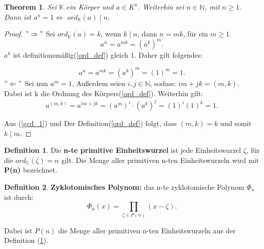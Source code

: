 \documentclass[12pt,oneside]{article}
\newtheorem{theorem}{Theorem}[section]
\theoremstyle{remark}
\theoremstyle{definition}
\newtheorem{definition}{Definition}[section]
\begin{document}
\smallskip

\begin{theorem}
Sei $\mathbb{K}$ ein Körper und $a \in K^x$. Weiterhin sei $ n \in \mathbb{N}$, mit $n \geq 1$. Dann ist $a^n = 1 \Leftrightarrow	 $ $ord_{\mathbb{K}}(a) \mid n$. 
\end{theorem}

\smallskip

\begin{proof}
$"\Rightarrow"$\newline
Sei $ord_{\mathbb{K}}(a) = k $, wenn $k \mid n$, dann $n = mk$, für ein $ m \geq 1$.
\begin{equation}
    a^n = a^{mk} = (a^k)^m. 
\end{equation}
$a^k$ ist definitionsmäßig(\ref{ord_def}) gleich 1. Daher gilt folgendes:

\begin{equation}
    a^n = a^{mk} = (a^k)^m = (1)^m = 1.
\end{equation}
$"\Leftarrow"$\newline
Sei nun $a^m = 1$, Außerdem seien $i,j \in \mathbb{N}$, sodass:\newline
$im + jk = (m,k)$. Dabei ist k die Ordnung des Körpers(\ref{ord_def}).\newline\newline
Weiterhin gilt: 
\begin{equation}\label{gcd_1}
   a^{(m,k)} = a^{im + jk} = (a^m)^i \cdot (a^k)^j = (1)^i (1)^k = 1.
\end{equation}

Aus (\ref{gcd_1}) und Der Definition(\ref{ord_def}) folgt, dass $(m,k) = k$ und somit $k \mid m$.
\end{proof}

\smallskip

\begin{definition}\label{prim_ein}
Die \textbf{n-te primitive Einheitswurzel} ist jede Einheitswurzel $\zeta$, für die $ord_{\mathbb{C}}(\zeta) = n $ gilt. Die Menge aller primitiven n-ten Einheitswurzeln wird mit \textbf{P(n)} bezeichnet. 
\end{definition}

\smallskip

\begin{definition}
\textbf{Zyklotomisches Polynom:} das n-te zyklotomische Polynom $\Phi_{n}$ ist durch:\newline
\begin{equation}
    \Phi_{n}(x) = \prod_{\zeta \in P(n)} (x -\zeta).
\end{equation}

Dabei ist $P(n)$ die Menge aller primitiven n-ten Einheitswurzeln aus der Definition (\ref{prim_ein}). 
\end{definition}
\end{document}
